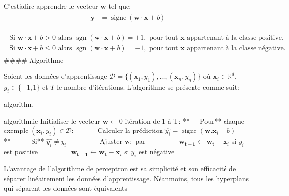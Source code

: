 \documentclass[letterpaper,11pt,english]{sphinxmanual}
\begin{document}
\sphinxAtStartPar
C’est\sphinxhyphen{}à\sphinxhyphen{}dire apprendre le vecteur \(\mathbf{w}\) tel que:
\begin{equation}\label{equation:chapter3:chapter3:25}
\begin{split}\begin{aligned}
  \mathbf{y}& = \operatorname{signe}\left(\mathbf{w}\cdot \mathbf{x} +b\right)
  \end{aligned}\end{split}
\end{equation}
\sphinxAtStartPar

\begin{equation}\label{equation:chapter3:chapter3:26}
\begin{split}\begin{aligned}
  \text{Si } \mathbf{w}\cdot \mathbf{x} +b>0 \text{ alors } \operatorname{sgn}(\mathbf{w}\cdot \mathbf{x} +b) =+1, \text{ pour tout } \mathbf{x} \text{ appartenant \`a la classe positive.}\\
  \text{Si } \mathbf{w}\cdot \mathbf{x} + b \leq 0 \text{ alors } \operatorname{sgn}(\mathbf{w}\cdot \mathbf{x} +b) = -1, \text{ pour tout } \mathbf{x} \text{ appartenant \`a la classe négative.}
  \end{aligned}\end{split}
\end{equation}
\sphinxAtStartPar
\#\#\#\# Algorithme

\sphinxAtStartPar
Soient les données d’apprentissage
\(\mathcal{D} = \{(\mathbf{x}_1, y_1), \dots, (\mathbf{x}_n, y_n)\}\)
où \(\mathbf{x}_i \in \mathbb{R}^d\), \(y_i \in \{-1,1\}\) et
\(T\) le nombre d’itérations. L’algorithme se présente comme suit:

\begin{sphinxuseclass}{algorithm}
\begin{sphinxuseclass}{algorithmic}
\sphinxAtStartPar
Initialiser le vecteur \(\mathbf{w} \leftarrow 0\) 
itération de 1 à T: **   Pour** chaque exemple
\((\mathbf{x}_i, y_i) \in \mathcal{D}:\)       Calculer la
prédiction
\(\hat{y_i} = \operatorname{signe }( \mathbf{w}. \mathbf{x}_i +b )\)
**      Si** \(\hat{y_i} \neq y_i\)           Ajuster
\(\mathbf{w} :\) par
         \(\mathbf{w_{t+1}} \leftarrow \mathbf{w_t}+\mathbf{x}_i\)
si \(y_i\) est positive
         \(\mathbf{w_{t+1}} \leftarrow \mathbf{w_t}-\mathbf{x}_i\)
si \(y_i\) est négative            

\end{sphinxuseclass}
\end{sphinxuseclass}
\sphinxAtStartPar
L’avantage de l’algorithme de perceptron est sa simplicité et son
efficacité de séparer linéairement les données d’apprentissage.
Néanmoins, tous les hyperplans qui séparent les données sont
équivalents.
\end{document}
